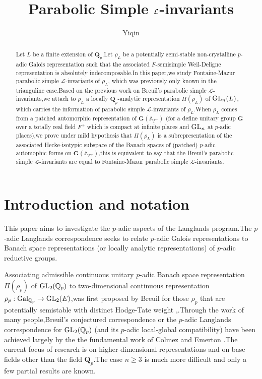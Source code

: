 \documentclass[SecEq,CM,GP]{degruyter-crelle} %
\title[]{Parabolic Simple $\sL$-invariants}
\author{Yiqin}{He}{}{Beijing}
\theoremstyle{plain}
\newcommand{\gal}{{\rm Gal}}
\newcommand{\GLN}{{\rm GL}}
\newcommand{\BA}{{\mathbb{A}}}
\newcommand{\BQ}{{\mathbb{Q}}}
\newcommand{\bG}{{\mathbf{G}}}
\newcommand{\bQ}{{\mathbf{Q}}}
\newcommand{\sL}{\mathcal L}
\begin{document}
\begin{abstract}
Let $L$ be a finite extension of $\bQ_p$.\;Let $\rho_L$ be a potentially semi-stable non-crystalline  $p$-adic Galois representation such that the associated $F$-semisimple Weil-Deligne representation is absolutely indecomposable.\;In this paper,\;we study Fontaine-Mazur parabolic simple $\sL$-invariants of $\rho_L$, which was previously only known in the trianguline case.\;Based on the previous work \cite{2022ext1hyq} on Breuil's parabolic simple $\sL$-invariants,\;we
attach to $\rho_L$ a locally $\bQ_p$-analytic representation $\Pi(\rho_L)$ of $\GLN_{n}(L)$, which carries the information of parabolic simple $\sL$-invariants of $\rho_L$.\;When $\rho_L$  comes from a patched automorphic representation of  $\bG(\BA_{F^+})$ (for a define unitary group $\bG$ over a totally real field $F^+$ which is compact at infinite places and $\GLN_n$ at $p$-adic places),\;we prove under mild hypothesis that $\Pi(\rho_L)$ is a subrepresentation of the associated Hecke-isotypic subspace of the Banach spaces of (patched) $p$-adic automophic forms on $\bG(\BA_{F^+})$,\;this is equivalent to say that the Breuil's parabolic simple $\sL$-invariants are equal to Fontaine-Mazur parabolic simple $\sL$-invariants.\;
\end{abstract}

 \tableofcontents %

\section{Introduction and notation}




This paper aims to investigate the $p$-adic aspects of the Langlands program.\;The $p$-adic Langlands correspondence seeks to relate $p$-adic Galois representations to Banach space representations (or locally analytic representations) of $p$-adic reductive groups.\;

Associating admissible continuous unitary  $p$-adic Banach space representation $\Pi(\rho_p)$ of $\GLN_2(\BQ_p)$ to two-dimensional continuous representation $\rho_p:\gal_{\BQ_p}\rightarrow \GLN_2(E)$,\;was first proposed by Breuil for those $\rho_p$ that are potentially semistable with distinct Hodge-Tate weight \cite{Breuil03a},\;\cite{Breuil03b}.\;Through the work of many people,\;Breuil's conjectured correspondence or the $p$-adic Langlands correspondence for $\GLN_2(\BQ_p)$ (and its  $p$-adic local-global compatibility) have been achieved largely by the the fundamental work of Colmez \cite{PADINGL2COL} and Emerton \cite{localglobalgl2}.\;The current focus of research is on higher-dimensional representations and on base fields other than the field $\bQ_p$.\;The case $n\geq 3$ is much more difficult and only a few partial results are known.\;
\end{document}
